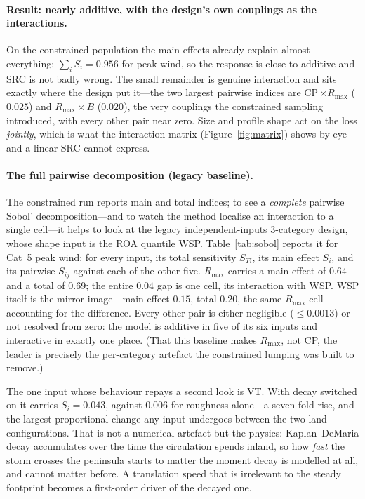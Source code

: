 \documentclass[11pt]{article}
\begin{document}
\paragraph{Result: nearly additive, with the design's own couplings as the
interactions.} On the constrained population the main effects already explain almost
everything: $\sum_i S_i=0.956$ for peak wind, so the response is close to additive and
SRC is not badly wrong. The small remainder is genuine interaction and sits exactly
where the design put it---the two largest pairwise indices are CP\,$\times R_{\max}$
($0.025$) and $R_{\max}\times B$ ($0.020$), the very couplings the constrained
sampling introduced, with every other pair near zero. Size and profile shape act on
the loss \emph{jointly}, which is what the interaction matrix
(Figure~\ref{fig:matrix}) shows by eye and a linear SRC cannot express.

\paragraph{The full pairwise decomposition (legacy baseline).} The constrained run
reports main and total indices; to see a \emph{complete} pairwise Sobol'
decomposition---and to watch the method localise an interaction to a single cell---it
helps to look at the legacy independent-inputs 3-category design, whose shape input is
the ROA quantile WSP. Table~\ref{tab:sobol} reports it for Cat~5 peak wind: for every
input, its total sensitivity $S_{Ti}$, its main effect $S_i$, and its pairwise
$S_{ij}$ against each of the other five. $R_{\max}$ carries a main effect of $0.64$
and a total of $0.69$; the entire $0.04$ gap is one cell, its interaction with WSP.
WSP itself is the mirror image---main effect $0.15$, total $0.20$, the same $R_{\max}$
cell accounting for the difference. Every other pair is either negligible
($\le 0.0013$) or not resolved from zero: the model is additive in five of its six
inputs and interactive in exactly one place. (That this baseline makes $R_{\max}$, not
CP, the leader is precisely the per-category artefact the constrained lumping was
built to remove.)

The one input whose behaviour repays a second look is VT. With decay switched on it
carries $S_i=0.043$, against $0.006$ for roughness alone---a seven-fold rise, and the
largest proportional change any input undergoes between the two land configurations.
That is not a numerical artefact but the physics: Kaplan--DeMaria decay accumulates
over the time the circulation spends inland, so how \emph{fast} the storm crosses the
peninsula starts to matter the moment decay is modelled at all, and cannot matter
before. A translation speed that is irrelevant to the steady footprint becomes a
first-order driver of the decayed one.
\end{document}
